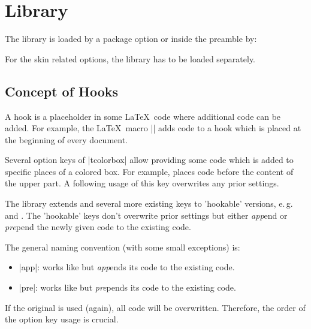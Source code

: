 \clearpage
\section{Library }\label{sec:hooks}%
%
The library is loaded by a package option or inside the preamble by:
\begin{dispListing}
\end{dispListing}

For the skin related options, the library  has to be loaded
separately.


\subsection{Concept of Hooks}
A hook is a placeholder in some \LaTeX\ code where additional code
can be added. For example, the \LaTeX\ macro |\AtBeginDocument| adds code to a
hook which is placed at the beginning of every document.

Several option keys of |tcolorbox| allow providing some code which is
added to specific places of a colored box. For example, 
places code before the content of the upper part. A following usage of this
key overwrites any prior settings.

The library  extends  and several more
existing keys to 'hookable' versions, e.\,g.\ 
 and .
The 'hookable' keys don't overwrite prior settings but either \emph{app}end
or \emph{pre}pend the newly given code to the existing code.

The general naming convention (with some small exceptions) is:
\begin{itemize}
\item {} |app|: works like  but
  \emph{app}ends its code to the existing code.
\item {} |pre|: works like \meta{option key} but
  \emph{pre}pends its code to the existing code.
\end{itemize}
If the original  is used (again), all code will be overwritten.
Therefore, the order of the option key usage is crucial.



